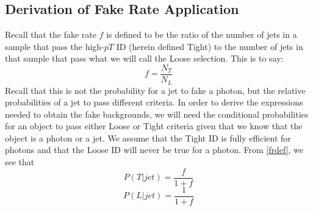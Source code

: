 \documentclass[11pt]{article}
\begin{document}
\newcommand{\potj}{P_1(T|jet)}
\newcommand{\pttj}{P_2(T|jet)}
\newcommand{\polj}{P_1(L|jet)}
\newcommand{\ptlj}{P_2(L|jet)}
\subsection*{Derivation of Fake Rate Application}
Recall that the fake rate $f$ is defined to be the ratio of the number of jets in a sample that pass the high-$pT$ ID (herein defined Tight) to the number of jets in that sample that pass what we will call the Loose selection.  This is to say:
\begin{equation} \label{frdef}
f=\frac{N_T}{N_L}
\end{equation}
Recall that this is not the probability for a jet to fake a photon, but the relative probabilities of a jet to pass different criteria.  In order to derive the expressions needed to obtain the fake backgrounds, we will need the conditional probabilities for an object to pass either Loose or Tight criteria given that we know that the object is a photon or a jet.  We assume that the Tight ID is fully efficient for photons and that the Loose ID will never be true for a photon.  From \ref{frdef}, we see that
\begin{equation}
P(T|jet)=\frac{f}{1+f}
\end{equation}
\begin{equation}
P(L|jet)=\frac{1}{1+f}
\end{equation}
\end{document}
